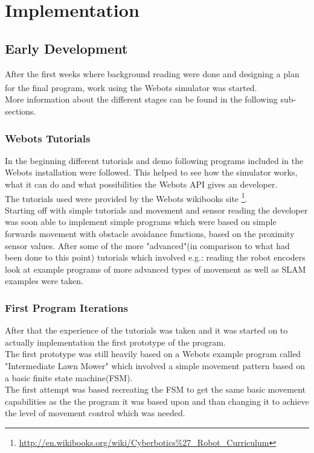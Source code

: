 
\chapter{Implementation}
\label{Implementation}

\section{Early Development}
After the first weeks where background reading were done and designing a plan for the final program, work using the Webots\textsuperscript{\texttrademark} simulator was started. \\ More information about the different stages can be found in the following sub-sections. 

\subsection{Webots Tutorials}
In the beginning different tutorials and demo following  programs included in the Webots installation were followed. 
This helped to see how the simulator works, what it can do and what possibilities the Webots API gives an developer. \\
The tutorials used were provided by the Webots wikibooks site \footnote{\url{http://en.wikibooks.org/wiki/Cyberbotics\%27_Robot_Curriculum}}.\\
Starting off with simple tutorials and movement and sensor reading the developer was soon able to implement simple programs which were based on simple forwards movement with obstacle avoidance functions, based on the proximity sensor values. 
After some of the more "advanced"(in comparison to what had been done to this point) tutorials which involved e.g.: reading the robot encoders look at example programs of more advanced types of movement as well as SLAM examples were taken. \\

\subsection{First Program Iterations}
After that the experience of the tutorials was taken and it was started on to actually implementation the first prototype of the program. \\
The first prototype was still heavily based on a Webots example program called "Intermediate Lawn Mower" which involved a simple movement pattern based on a basic finite state machine(FSM). \\ 
The first attempt was based recreating the FSM to get the same basic movement capabilities as the the program it was based upon and than changing it to achieve the level of movement control which was needed. \\[3ex]

